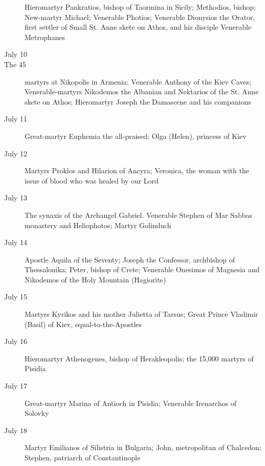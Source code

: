 \begin{description}
Hieromartyr Pankratios, bishop of Taormina in Sicily; Methodios, bishop; New-martyr Michael; Venerable Photios; Venerable Dionysios the Orator, first settler of Small St. Anne skete on Athos, and his disciple Venerable Metrophanes

\item[July 10]

\item[The 45] martyrs at Nikopolis in Armenia; Venerable Anthony of the Kiev Caves; Venerable-martyrs Nikodemos the Albanian and Nektarios of the St. Anne skete on Athos; Hieromartyr Joseph the Damascene and his companions

\item[July 11]

Great-martyr Euphemia the all-praised; Olga (Helen), princess of Kiev

\item[July 12]

Martyrs Proklos and Hilarion of Ancyra; Veronica, the woman with the issue of blood who was healed by our Lord

\item[July 13]

The synaxis of the Archangel Gabriel. Venerable Stephen of Mar Sabbas monastery and Heliophotos; Martyr Golinduch

\item[July 14]

Apostle Aquila of the Seventy; Joseph the Confessor, archbishop of Thessalonika; Peter, bishop of Crete; Venerable Onesimos of Magnesia and Nikodemos of the Holy Mountain (Hagiorite)

\item[July 15]

Martyrs Kyrikos and his mother Julietta of Tarsus; Great Prince Vladimir (Basil) of Kiev, equal-to-the-Apostles

\item[July 16]

Hieromartyr Athenogenes, bishop of Herakleopolis; the 15,000 martyrs of Pisidia

\item[July 17]

Great-martyr Marina of Antioch in Pisidia; Venerable Irenarchos of Solovky

\item[July 18]

Martyr Emilianos of Silistria in Bulgaria; John, metropolitan of Chalcedon; Stephen, patriarch of Constantinople


\end{description}
